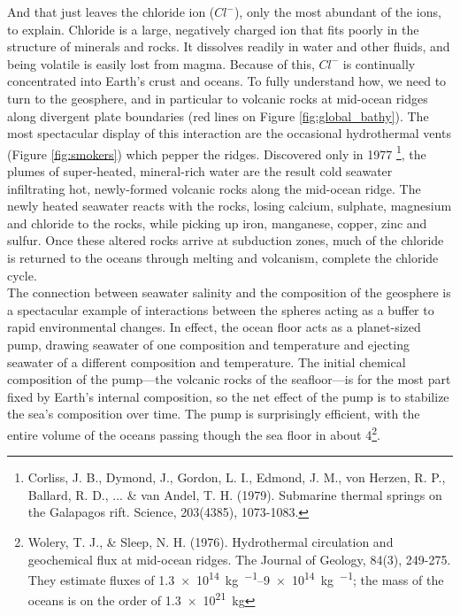 \documentclass[amstex,12pt]{book}
\begin{document}
And that just leaves the chloride ion ($Cl^-$), only the most abundant of the ions, to explain. Chloride is a large, negatively charged ion that fits poorly in the structure of minerals and rocks. It dissolves readily in water and other fluids, and being volatile is easily lost from magma. Because of this, $Cl^-$ is continually concentrated into Earth's crust and oceans. To fully understand how, we need to turn to the geosphere, and in particular to volcanic rocks at mid-ocean ridges along divergent plate boundaries (red lines on Figure \ref{fig:global_bathy}). The most spectacular display of this interaction are the occasional hydrothermal vents (Figure \ref{fig:smokers}) which pepper the ridges. Discovered only in 1977 \footnote{Corliss, J. B., Dymond, J., Gordon, L. I., Edmond, J. M., von Herzen, R. P., Ballard, R. D., ... \& van Andel, T. H. (1979). Submarine thermal springs on the Galapagos rift. Science, 203(4385), 1073-1083.}, the plumes of super-heated, mineral-rich water are the result cold seawater infiltrating hot, newly-formed volcanic rocks along the mid-ocean ridge. The newly heated seawater reacts with the rocks, losing calcium, sulphate, magnesium and chloride to the rocks, while picking up iron, manganese, copper, zinc and sulfur. Once these altered rocks arrive at subduction zones, much of the chloride is returned to the oceans through melting and volcanism, complete the chloride cycle.\\

The connection between seawater salinity and the composition of the geosphere is a spectacular example of interactions between the spheres acting as a buffer to rapid environmental changes. In effect, the ocean floor acts as a planet-sized pump, drawing seawater of one composition and temperature and ejecting seawater of a different composition and temperature. The initial chemical composition of the pump---the volcanic rocks of the seafloor---is for the most part fixed by Earth's internal composition, so the net effect of the pump is to stabilize the sea's composition over time. The pump is surprisingly efficient, with the entire volume of the oceans passing though the sea floor in about \SI{4}{\ma}\footnote{Wolery, T. J., \& Sleep, N. H. (1976). Hydrothermal circulation and geochemical flux at mid-ocean ridges. The Journal of Geology, 84(3), 249-275. They estimate fluxes of \SIrange{1.3e14}{9e14}{\kg\per\year}; the mass of the oceans is on the order of \SI{1.3e21}{\kg}}.   \\

\end{document}
